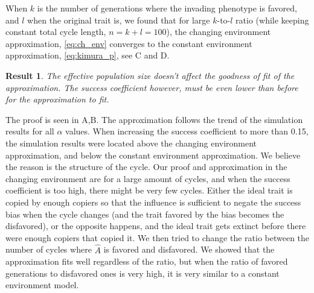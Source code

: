\documentclass[12pt]{extarticle}
\newtheorem{result}{Result}
\begin{document}
When $k$ is the number of generations where the invading phenotype is favored, and $l$ when the original trait is, we found that for large $k$-to-$l$ ratio (while keeping constant total cycle length, $n=k+l=100$), the changing environment approximation, \cref{eq:ch_env} converges to the constant environment approximation, \cref{eq:kimura_p}, see C and D.

\begin{result}
The effective population size doesn't affect the goodness of fit of the approximation. The success coefficient however, must be even lower than before for the approximation to fit.
\end{result}
The proof is seen in A,B. The approximation follows the trend of the simulation results for all $\alpha$ values.
When increasing the success coefficient to more than 0.15, the simulation results were located above the changing environment approximation, and below the constant environment approximation. We believe the reason is the structure of the cycle.
Our proof and approximation in the changing environment are for a large amount of cycles, and when the success coefficient is too high, there might be very few cycles. Either the ideal trait is copied by enough copiers so that the influence is sufficient to negate the success bias when the cycle changes (and the trait favored by the bias becomes the disfavored), or the opposite happens, and the ideal trait gets extinct before there were enough copiers that copied it.
We then tried to change the ratio between the number of cycles where $\hat{A}$ is favored and disfavored. We showed that the approximation fits well regardless of the ratio, but when the ratio of favored generations to disfavored ones is very high, it is very similar to a constant environment model.
\end{document}
